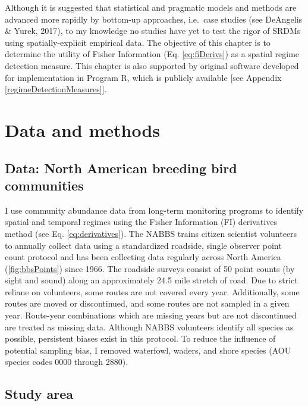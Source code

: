 \documentclass[12pt,twoside,openany]{reedthesis}
\begin{document}
Although it is suggested that statistical and pragmatic models and methods are advanced more rapidly by bottom-up approaches, i.e.~case studies (see DeAngelis \& Yurek, 2017), to my knowledge no studies have yet to test the rigor of SRDMs using spatially-explicit empirical data. The objective of this chapter is to determine the utility of Fisher Information (Eq. \eqref{eq:fiDerivs}) as a spatial regime detection measure. This chapter is also supported by original software developed for implementation in Program R, which is publicly available {[}see Appendix \ref{regimeDetectionMeasures}{]}.

\hypertarget{data-and-methods}{%
\section{Data and methods}\label{data-and-methods}}

\hypertarget{data-north-american-breeding-bird-communities}{%
\subsection{Data: North American breeding bird communities}\label{data-north-american-breeding-bird-communities}}

I use community abundance data from long-term monitoring programs to identify spatial and temporal regimes using the Fisher Information (FI) derivatives method (see Eq. \eqref{eq:derivatives}). The NABBS trains citizen scientist volunteers to annually collect data using a standardized roadside, single observer point count protocol and has been collecting data regularly across North America (\ref{fig:bbsPoints}) since 1966. The roadside surveys consist of 50 point counts (by sight and sound) along an approximately 24.5 mile stretch of road. Due to strict reliane on volunteers, some routes are not covered every year. Additionally, some routes are moved or discontinued, and some routes are not sampled in a given year. Route-year combinations which are missing years but are not discontinued are treated as missing data. Although NABBS volunteers identify all species as possible, persistent biases exist in this protocol. To reduce the influence of potential sampling bias, I removed waterfowl, waders, and shore species (AOU species codes 0000 through 2880).

\hypertarget{study-area}{%
\subsection{Study area}\label{study-area}}
\end{document}
